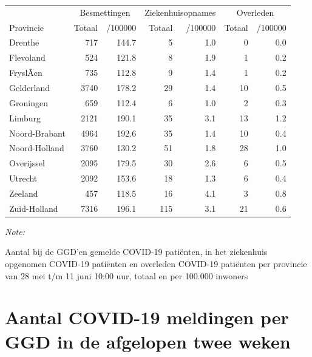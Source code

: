 \documentclass[
  english,
  man,floatsintext]{apa6}
\begin{document}
\begin{table}
\centering
\begin{threeparttable}
\begin{tabular}{lrrrrrr}
\toprule
\multicolumn{1}{c}{ } & \multicolumn{2}{c}{Besmettingen} & \multicolumn{2}{c}{Ziekenhuisopnames} & \multicolumn{2}{c}{Overleden} \\
\cmidrule(l{3pt}r{3pt}){2-3} \cmidrule(l{3pt}r{3pt}){4-5} \cmidrule(l{3pt}r{3pt}){6-7}
Provincie & Totaal & /100000 & Totaal & /100000 & Totaal & /100000\\
\midrule
Drenthe & 717 & 144.7 & 5 & 1.0 & 0 & 0.0\\
Flevoland & 524 & 121.8 & 8 & 1.9 & 1 & 0.2\\
FryslÃ¢n & 735 & 112.8 & 9 & 1.4 & 1 & 0.2\\
Gelderland & 3740 & 178.2 & 29 & 1.4 & 10 & 0.5\\
Groningen & 659 & 112.4 & 6 & 1.0 & 2 & 0.3\\
Limburg & 2121 & 190.1 & 35 & 3.1 & 13 & 1.2\\
Noord-Brabant & 4964 & 192.6 & 35 & 1.4 & 10 & 0.4\\
Noord-Holland & 3760 & 130.2 & 51 & 1.8 & 28 & 1.0\\
Overijssel & 2095 & 179.5 & 30 & 2.6 & 6 & 0.5\\
Utrecht & 2092 & 153.6 & 18 & 1.3 & 6 & 0.4\\
Zeeland & 457 & 118.5 & 16 & 4.1 & 3 & 0.8\\
Zuid-Holland & 7316 & 196.1 & 115 & 3.1 & 21 & 0.6\\
\bottomrule
\end{tabular}
\begin{tablenotes}
\item \textit{Note: } 
\item Aantal bij de GGD’en gemelde COVID-19 patiënten, in het ziekenhuis opgenomen COVID-19 patiënten en overleden COVID-19 patiënten per provincie van 28 mei t/m 11 juni 10:00 uur, totaal en per 100.000 inwoners
\end{tablenotes}
\end{threeparttable}
\end{table}

\newpage

\hypertarget{aantal-covid-19-meldingen-per-ggd-in-de-afgelopen-twee-weken}{%
\section{Aantal COVID-19 meldingen per GGD in de afgelopen twee weken}\label{aantal-covid-19-meldingen-per-ggd-in-de-afgelopen-twee-weken}}
\end{document}
